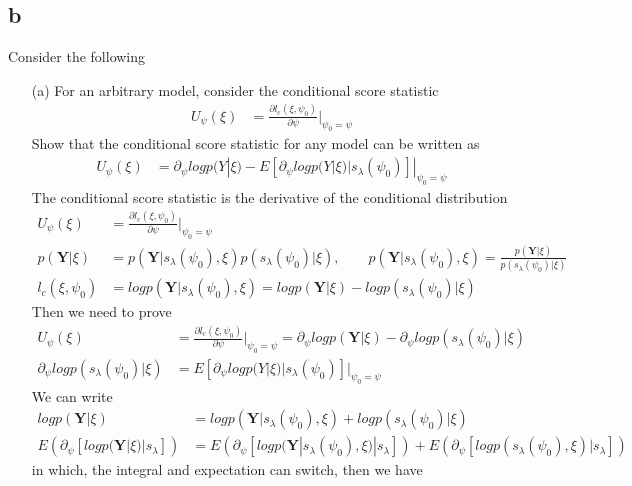 \documentclass[11pt]{article} %
\begin{document}
\subsection{b}Consider the following
\begin{itemize}
	\item[(a)] For an arbitrary model, consider the conditional score statistic
	\begin{align*}
		U_{\psi}(\xi) &= \frac{\partial l_c(\xi, \psi_0)}{\partial \psi} |_{\psi_0=\psi}
	\end{align*} 
	Show that the conditional score statistic for any model can be written as
	\begin{align*}
		U_{\psi}(\xi) &= \partial_{\psi} log p(Y|\xi)- E[\partial_{\psi} log p(Y|\xi)|s_{\lambda}(\psi_0)]|_{\psi_0=\psi}
	\end{align*} 
	The conditional score statistic is the derivative of the conditional distribution
	\begin{align*}
		U_{\psi}(\xi) &= \frac{\partial l_c(\xi, \psi_0)}{\partial \psi} |_{\psi_0=\psi}\\
		p(\textbf{Y}| \xi) &= p(\textbf{Y}|s_{\lambda}(\psi_0), \xi) p(s_{\lambda}(\psi_0) | \xi), \qquad p(\textbf{Y}|s_{\lambda}(\psi_0), \xi) = \frac{p(\textbf{Y}| \xi)}{p(s_{\lambda}(\psi_0) | \xi)} \\
		l_c(\xi, \psi_0) &= log p(\textbf{Y}|s_{\lambda}(\psi_0), \xi)= log p(\textbf{Y}| \xi) - log p(s_{\lambda}(\psi_0) | \xi)
	\end{align*}
	Then we need to prove 
	\begin{align*}
		U_{\psi}(\xi) &= \frac{\partial l_c(\xi, \psi_0)}{\partial \psi} |_{\psi_0=\psi} = \partial_{\psi} log p(\textbf{Y}| \xi) - \partial_{\psi} log p(s_{\lambda}(\psi_0) | \xi)\\
		\partial_{\psi} log p(s_{\lambda}(\psi_0) | \xi) &= E[\partial_{\psi} log p(Y|\xi)|s_{\lambda}(\psi_0)]|_{\psi_0=\psi}
	\end{align*}
	We can write
	\begin{align*}
		log p(\textbf{Y}| \xi) &= log  p(\textbf{Y}|s_{\lambda}(\psi_0), \xi) + log p(s_{\lambda}(\psi_0) | \xi)\\
		E \left( \partial_{\psi}[log p(\textbf{Y}| \xi)| s_{\lambda}]\right) &= E \left(\partial_{\psi}[log  p(\textbf{Y}|s_{\lambda}(\psi_0), \xi)|s_{\lambda}]\right) + E \left(\partial_{\psi}[log p(s_{\lambda}(\psi_0), \xi)|s_{\lambda}]\right)
	\end{align*}    
	in which, the integral and expectation can switch, then we have

\end{itemize}
\end{document}
